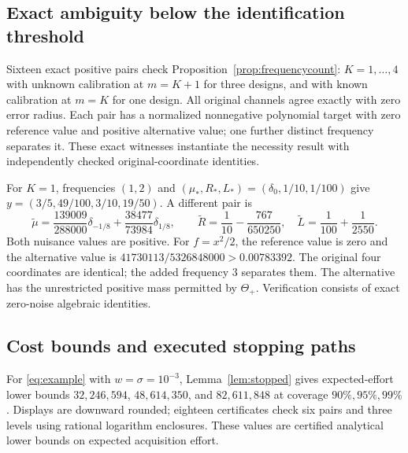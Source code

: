 \documentclass[10pt]{amsart}
\theoremstyle{definition}
\theoremstyle{remark}
\newcommand{\ThetaAll}{\Theta_+}
\begin{document}
\subsection{Exact ambiguity below the identification threshold}
Sixteen exact positive pairs check Proposition~\ref{prop:frequencycount}: $K=1,\ldots,4$ with unknown calibration at $m=K+1$ for three designs, and with known calibration at $m=K$ for one design. All original channels agree exactly with zero error radius. Each pair has a normalized nonnegative polynomial target with zero reference value and positive alternative value; one further distinct frequency separates it. These exact witnesses instantiate the necessity result with independently checked original-coordinate identities.

For $K=1$, frequencies $(1,2)$ and $(\mu_*,R_*,L_*)=(\delta_0,1/10,1/100)$ give $y=(3/5,49/100,3/10,19/50)$. A different pair is
\[
 \widetilde\mu=\frac{139009}{288000}\delta_{-1/8}
       +\frac{38477}{73984}\delta_{1/8},\qquad
 \widetilde R=\frac1{10}-\frac{767}{650250},\quad
 \widetilde L=\frac1{100}+\frac1{2550}.
\]
Both nuisance values are positive. For $f=x^2/2$, the reference value is zero and the alternative value is $41730113/5326848000>0.00783392$. The original four coordinates are identical; the added frequency $3$ separates them. The alternative has the unrestricted positive mass permitted by $\ThetaAll$. Verification consists of exact zero-noise algebraic identities.

\subsection{Cost bounds and executed stopping paths}
For \eqref{eq:example} with $w=\sigma=10^{-3}$, Lemma~\ref{lem:stopped} gives expected-effort lower bounds $32{,}246{,}594$, $48{,}614{,}350$, and $82{,}611{,}848$ at coverage $90\%,95\%,99\%$. Displays are downward rounded; eighteen certificates check six pairs and three levels using rational logarithm enclosures. These values are certified analytical lower bounds on expected acquisition effort.
\end{document}
